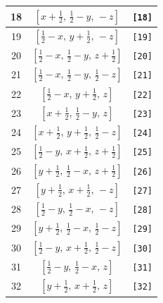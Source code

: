\documentclass[fleqn,8pt]{jsarticle}
\begin{document}
\begin{longtable}{ccc}
18 & $\left[ x + \frac{1}{2},\, \frac{1}{2} - y,\, - z \right]$ & {\tt [18]} \\ \hline
19 & $\left[ \frac{1}{2} - x,\, y + \frac{1}{2},\, - z \right]$ & {\tt [19]} \\ \hline
20 & $\left[ \frac{1}{2} - x,\, \frac{1}{2} - y,\, z + \frac{1}{2} \right]$ & {\tt [20]} \\ \hline
21 & $\left[ \frac{1}{2} - x,\, \frac{1}{2} - y,\, \frac{1}{2} - z \right]$ & {\tt [21]} \\ \hline
22 & $\left[ \frac{1}{2} - x,\, y + \frac{1}{2},\, z \right]$ & {\tt [22]} \\ \hline
23 & $\left[ x + \frac{1}{2},\, \frac{1}{2} - y,\, z \right]$ & {\tt [23]} \\ \hline
24 & $\left[ x + \frac{1}{2},\, y + \frac{1}{2},\, \frac{1}{2} - z \right]$ & {\tt [24]} \\ \hline
25 & $\left[ \frac{1}{2} - y,\, x + \frac{1}{2},\, z + \frac{1}{2} \right]$ & {\tt [25]} \\ \hline
26 & $\left[ y + \frac{1}{2},\, \frac{1}{2} - x,\, z + \frac{1}{2} \right]$ & {\tt [26]} \\ \hline
27 & $\left[ y + \frac{1}{2},\, x + \frac{1}{2},\, - z \right]$ & {\tt [27]} \\ \hline
28 & $\left[ \frac{1}{2} - y,\, \frac{1}{2} - x,\, - z \right]$ & {\tt [28]} \\ \hline
29 & $\left[ y + \frac{1}{2},\, \frac{1}{2} - x,\, \frac{1}{2} - z \right]$ & {\tt [29]} \\ \hline
30 & $\left[ \frac{1}{2} - y,\, x + \frac{1}{2},\, \frac{1}{2} - z \right]$ & {\tt [30]} \\ \hline
31 & $\left[ \frac{1}{2} - y,\, \frac{1}{2} - x,\, z \right]$ & {\tt [31]} \\ \hline
32 & $\left[ y + \frac{1}{2},\, x + \frac{1}{2},\, z \right]$ & {\tt [32]} \\
\end{longtable}
\end{document}
